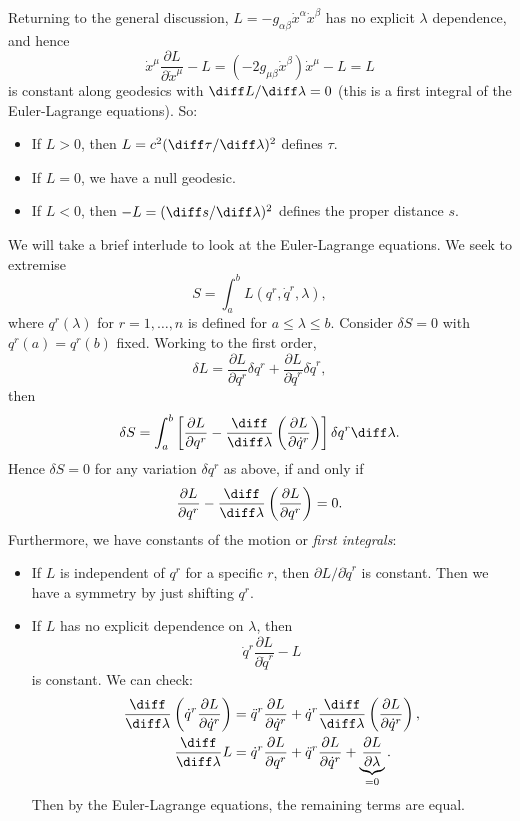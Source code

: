 \documentclass[12pt]{article}
\begin{document}

Returning to the general discussion, $L = -g_{\alpha \beta}\dot x^\alpha \dot x^\beta$ has no explicit $\lambda$ dependence, and hence
\[
\dot x^\mu \frac{\partial L}{\partial \dot x^\mu} - L = (-2 g_{\mu \beta} \dot x^\beta)\dot x^\mu - L = L
\]
is constant along geodesics with $\diff L/\diff \lambda = 0$ (this is a first integral of the Euler-Lagrange equations). So:
\begin{itemize}
	\item If $L > 0$, then $L = c^2(\diff \tau/\diff \lambda)^2$ defines $\tau$.
	\item If $L = 0$, we have a null geodesic.
	\item If $L < 0$, then $-L = (\diff s/\diff \lambda)^2$ defines the proper distance $s$.
\end{itemize}

We will take a brief interlude to look at the Euler-Lagrange equations. We seek to extremise
\[
S = \int_a^b L(q^r, \dot q^r, \lambda),
\]
where $q^r(\lambda)$ for $r = 1, \ldots, n$ is defined for $a \leq \lambda \leq b$. Consider $\delta S = 0$ with $q^r(a) = q^r(b)$ fixed. Working to the first order,
\[
\delta L = \frac{\partial L}{\partial q^r} \delta q^r + \frac{\partial L}{\partial \dot q^r} \delta \dot q^r,
\]
then
\[
\delta S = \int_a^b \left[ \frac{\partial L}{\partial q^r} - \frac{\diff}{\diff \lambda} \left( \frac{\partial L}{\partial \dot q^r} \right) \right] \delta q^r \diff \lambda.
\]
Hence $\delta S = 0$ for any variation $\delta q^r$ as above, if and only if
\[
\frac{\partial L}{\partial q^r} - \frac{\diff}{\diff \lambda} \left( \frac{\partial L}{\partial q^r} \right) = 0.
\]
Furthermore, we have constants of the motion or \emph{first integrals}:
\begin{itemize}
	\item If $L$ is independent of $q^r$ for a specific $r$, then $\partial L/\partial \dot q^r$ is constant. Then we have a symmetry by just shifting $q^r$.
	\item If $L$ has no explicit dependence on $\lambda$, then
		\[
		\dot q^r \frac{\partial L}{\partial \dot q^r} - L
		\]
		is constant. We can check:
		\begin{align*}
			\frac{\diff}{\diff \lambda} \left( \dot q^r \frac{\partial L}{\partial \dot q^r} \right) &= \ddot q^r \frac{\partial L}{\partial \dot q^r} + \dot q^r \frac{\diff}{\diff \lambda} \left( \frac{\partial L}{\partial \dot q^r}\right), \\
			\frac{\diff}{\diff \lambda} L &= \dot q^r \frac{\partial L}{\partial q^r} + \ddot q^r \frac{\partial L}{\partial \dot q^r} + \underbrace{\frac{\partial L}{\partial \lambda}}_{=0}.
		\end{align*}
	Then by the Euler-Lagrange equations, the remaining terms are equal.
\end{itemize}
\end{document}
